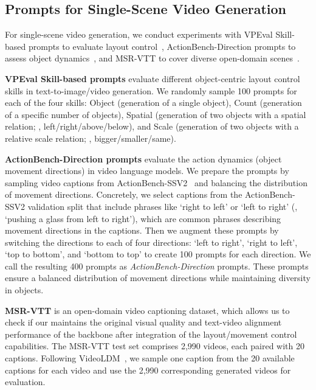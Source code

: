 \subsection{Prompts for Single-Scene Video Generation}
\label{sec:single_scene_evaluation_dataset_appendix}


For single-scene video generation,
we conduct experiments with
VPEval Skill-based prompts to evaluate layout control~\citep{cho2023visual},
ActionBench-Direction prompts to assess object dynamics~\citep{wang2023paxion},
and MSR-VTT to cover diverse open-domain scenes~\citep{xu2016msr-vtt}.


\textbf{VPEval Skill-based prompts} 
evaluate different object-centric layout control skills in text-to-image/video generation.
We randomly sample 100 prompts for each of the four skills:
Object (generation of a single object),
Count (generation of a specific number of objects),
Spatial (generation of two objects with a spatial relation; \eg{}, left/right/above/below),
and Scale (generation of two objects with a relative scale relation; \eg{}, bigger/smaller/same).


\textbf{ActionBench-Direction prompts} 
evaluate the action dynamics (object movement directions) in video language models.
We prepare the prompts by sampling video captions from ActionBench-SSV2~\citep{wang2023paxion} and balancing the distribution of movement directions.
Concretely, we select captions from the ActionBench-SSV2 validation split that include phrases like `right to left' or `left to right' (\eg{}, `pushing a glass from left to right'), which are common phrases describing movement directions in the captions.
Then we augment these prompts by switching the directions to each of four directions: `left to right', `right to left', `top to bottom', and `bottom to top' to create 100 prompts for each direction.
We call the resulting 400 prompts as \textit{ActionBench-Direction} prompts. These prompts ensure a balanced distribution of movement directions while maintaining diversity in objects.

\textbf{MSR-VTT} is an open-domain video captioning dataset, which allows us to check if 
our \videomodule{} maintains the original visual quality and text-video alignment performance of the \modelscope{} backbone after integration of the layout/movement control capabilities.
The MSR-VTT test set comprises 2,990 videos, each paired with 20 captions.
Following VideoLDM~\citep{blattmann2023align}, we sample one caption from the 20 available captions for each video and use the 2,990 corresponding generated videos for evaluation. 


